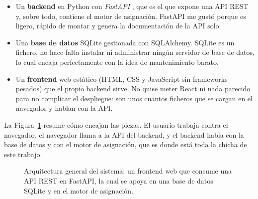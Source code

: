 \documentclass[11pt,a4paper,spanish]{book}
\numberwithin{equation}{chapter}
\numberwithin{figure}{chapter}
\numberwithin{table}{chapter}
\newcommand{\fuente}[1]{\par\vspace{2pt}{\footnotesize\textit{Fuente: #1}}}
\begin{document}
\begin{itemize}
\item Un {\bf backend} en Python con \emph{FastAPI} \cite{fastapi}, que es el que expone una API REST y, sobre todo, contiene el motor de asignación. FastAPI me gustó porque es ligero, rápido de montar y genera la documentación de la API solo.
\item Una {\bf base de datos} SQLite gestionada con SQLAlchemy. SQLite es un fichero, no hace falta instalar ni administrar ningún servidor de base de datos, lo cual encaja perfectamente con la idea de mantenimiento barato.
\item Un {\bf frontend} web estático (HTML, CSS y JavaScript sin frameworks pesados) que el propio backend sirve. No quise meter React ni nada parecido para no complicar el despliegue: son unos cuantos ficheros que se cargan en el navegador y hablan con la API.
\end{itemize}

La Figura~\ref{fig:arquitectura} resume cómo encajan las piezas. El usuario trabaja contra el navegador, el navegador llama a la API del backend, y el backend habla con la base de datos y con el motor de asignación, que es donde está toda la chicha de este trabajo.

\begin{figure}[ht]
\centering
{}
\caption{Arquitectura general del sistema: un frontend web que consume una API REST en FastAPI, la cual se apoya en una base de datos SQLite y en el motor de asignación.}
\label{fig:arquitectura}
\fuente{elaboración propia.}
\end{figure}
\end{document}
